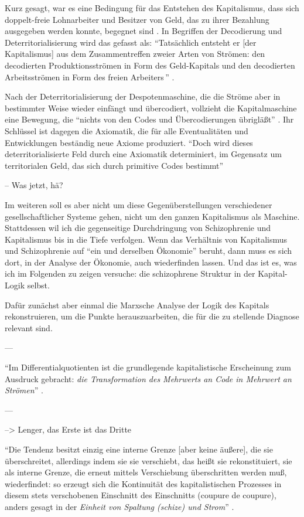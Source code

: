 \documentclass[12pt,
               DIV13,
               paper=a4,
               twoside=false,
               onehalfspacing,
               bibliography=totoc,
               toc=graduated,
               draft,
               ]{scrartcl}
\newcommand{\pc}[2]{\parencite[#1]{#2}}
\newcommand{\vgl}[2]{\parencite[vgl.][#1]{#2}}
\newcommand{\worries}[1]{\ifdraft{\textcolor{blue}{\texttt{(#1)}}}{}}
\begin{document}
Kurz gesagt, war es eine Bedingung für das Entstehen des Kapitalismus,
dass sich doppelt-freie Lohnarbeiter und Besitzer von Geld, das zu
ihrer Bezahlung ausgegeben werden konnte, begegnet sind
\vgl{742}{kap}. In Begriffen der Decodierung und Deterritorialisierung
wird das gefasst als: "`Tatsächlich entsteht er [der Kapitalismus] aus
dem Zusammentreffen zweier Arten von Strömen: den decodierten
Produktionsströmen in Form des Geld-Kapitals und den decodierten
Arbeitsströmen in Form des \glq freien Arbeiters\grq\,"' \pc{44}{ao}.

Nach der Deterritorialisierung der Despotenmaschine, die die Ströme
aber in bestimmter Weise wieder einfängt und übercodiert, vollzieht
die Kapitalmaschine eine Bewegung, die "`nichts von den Codes und
Übercodierungen übrigläßt"' \pc{337}{ao}. Ihr Schlüssel ist dagegen
die Axiomatik, die für alle Eventualitäten und Entwicklungen beständig
neue Axiome produziert. "`Doch wird dieses deterritorialisierte Feld
durch eine Axiomatik determiniert, im Gegensatz um territorialen Geld,
das sich durch primitive Codes bestimmt"' \pc{322}{ao}

-- Was jetzt, hä?

Im weiteren soll es aber nicht um diese Gegenüberstellungen
verschiedener gesellschaftlicher Systeme gehen, nicht um den ganzen
Kapitalismus als Maschine. Stattdessen wil ich die gegenseitige
Durchdringung von Schizophrenie und Kapitalismus bis in die Tiefe
verfolgen. Wenn das Verhältnis von Kapitalismus und Schizophrenie auf
"`ein und derselben Ökonomie"' beruht, dann muss es sich dort, in der
Analyse der Ökonomie, auch wiederfinden lassen. Und das ist es, was
ich im Folgenden zu zeigen versuche: die schizophrene Struktur in der
Kapital-Logik selbst.

Dafür zunächst aber einmal die Marxsche Analyse der Logik des Kapitals
rekonstruieren, um die Punkte herauszuarbeiten, die für die zu
stellende Diagnose relevant sind.

\worries{Mehr: Organloser voller Körper usw.}

---

"`Im Differentialquotienten ist die grundlegende kapitalistische
Erscheinung zum Ausdruck gebracht: \emph{die Transformation des
Mehrwerts an Code in Mehrwert an Strömen}"' \pc{S. 292 f.}{ao}.

---

--> Lenger, das Erste ist das Dritte

"`Die Tendenz besitzt einzig eine interne Grenze [aber keine äußere],
die sie überschreitet, allerdings indem sie sie verschiebt, das heißt
sie rekonstituiert, sie als interne Grenze, die erneut mittels
Verschiebung überschritten \worries{Selbst-Überschreitung} werden muß,
wiederfindet: so erzeugt sich die Kontinuität des kapitalistischen
Prozesses in diesem stets verschobenen Einschnitt des Einschnitts
(coupure de coupure), anders gesagt in der \emph{Einheit von Spaltung
(schize) und Strom}"' \pc{S. 296, meine Hervorh.}{ao}.
\end{document}
